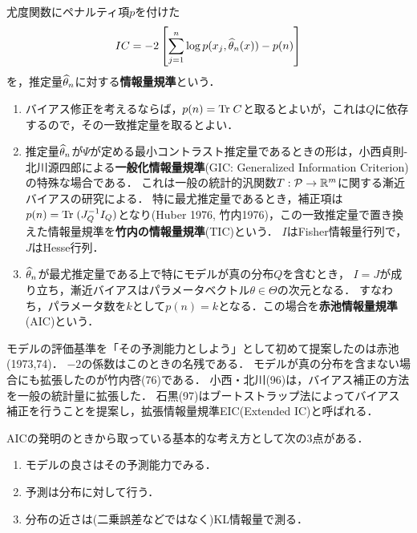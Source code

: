 \documentclass[uplatex,dvipdfmx]{jsreport}
\begin{document}
\begin{definition}
    尤度関数にペナルティ項$p$を付けた
    \[IC=-2\left[\sum^n_{j=1}\log p(x_j,\widehat{\theta}_n(x))-p(n)\right]\]
    を，推定量$\widehat{\theta}_n$に対する\textbf{情報量規準}という．
\end{definition}

\begin{example}\mbox{}
    \begin{enumerate}
        \item バイアス修正を考えるならば，$p(n)=\mathrm{Tr}\; C$と取るとよいが，これは$Q$に依存するので，その一致推定量を取るとよい．
        \item 推定量$\widehat{\theta}_n$が$\Psi$が定める最小コントラスト推定量であるときの形は，小西貞則-北川源四郎による\textbf{一般化情報量規準}(GIC: Generalized Information Criterion)の特殊な場合である．
        これは一般の統計的汎関数$T:\mathcal{P}\to\mathbb{R}^m$に関する漸近バイアスの研究による．
        特に最尤推定量であるとき，補正項は$p(n)=\mathrm{Tr}\;(J_Q^{-1}I_Q)$となり(Huber 1976, 竹内1976)，この一致推定量で置き換えた情報量規準を\textbf{竹内の情報量規準}(TIC)という．
        $I$はFisher情報量行列で，$J$はHesse行列．
        \item $\widehat{\theta}_n$が最尤推定量である上で特にモデルが真の分布$Q$を含むとき，
        $I=J$が成り立ち，漸近バイアスはパラメータベクトル$\theta\in\Theta$の次元となる．
        すなわち，パラメータ数を$k$として$p(n)=k$となる．この場合を\textbf{赤池情報量規準}(AIC)という．
    \end{enumerate}
\end{example}

\begin{history}
    モデルの評価基準を「その予測能力としよう」として初めて提案したのは赤池(1973,74)．
    $-2$の係数はこのときの名残である．
    モデルが真の分布を含まない場合にも拡張したのが竹内啓(76)である．
    小西・北川(96)は，バイアス補正の方法を一般の統計量に拡張した．
    石黒(97)はブートストラップ法によってバイアス補正を行うことを提案し，拡張情報量規準EIC(Extended IC)と呼ばれる．
\end{history}

\begin{remark}
    AICの発明のときから取っている基本的な考え方として次の3点がある．
    \begin{enumerate}
        \item モデルの良さはその予測能力でみる．
        \item 予測は分布に対して行う．
        \item 分布の近さは(二乗誤差などではなく)KL情報量で測る．
    \end{enumerate}
\end{remark}
\end{document}
